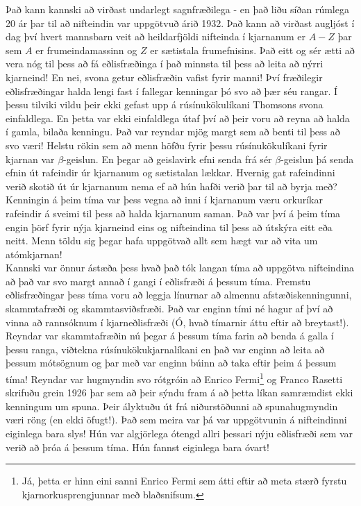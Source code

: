 \ifdefined \wholebook \else\documentclass[oneside]{book}\usepackage{EdlBook}\graphicspath{{figures/}}
\begin{document}
Það kann kannski að virðast undarlegt sagnfræðilega - en það liðu síðan rúmlega 20 ár þar til að nifteindin var uppgötvuð árið 1932. Það kann að virðast augljóst í dag því hvert mannsbarn veit að heildarfjöldi nifteinda í kjarnanum er $A-Z$ þar sem $A$ er frumeindamassinn og $Z$ er sætistala frumefnisins. Það eitt og sér ætti að vera nóg til þess að fá eðlisfræðinga í það minnsta til þess að leita að nýrri kjarneind! En nei, svona getur eðlisfræðin vafist fyrir manni! Því fræðilegir eðlisfræðingar halda lengi fast í fallegar kenningar þó svo að þær séu rangar. Í þessu tilviki vildu þeir ekki gefast upp á rúsínukökulíkani Thomsons svona einfaldlega. En þetta var ekki einfaldlega útaf því að þeir voru að reyna að halda í gamla, bilaða kenningu. Það var reyndar mjög margt sem að benti til þess að svo væri! Helstu rökin sem að menn höfðu fyrir þessu rúsínukökulíkani fyrir kjarnan var $\beta$-geislun. En þegar að geislavirk efni senda frá sér $\beta$-geislun þá senda efnin út rafeindir úr kjarnanum og sætistalan lækkar. Hvernig gat rafeindinni verið skotið út úr kjarnanum nema ef að hún hafði verið þar til að byrja með? Kenningin á þeim tíma var þess vegna að inni í kjarnanum væru orkuríkar rafeindir á sveimi til þess að halda kjarnanum saman. Það var því á þeim tíma engin þörf fyrir nýja kjarneind eins og nifteindina til þess að útskýra eitt eða neitt. Menn töldu sig þegar hafa uppgötvað allt sem hægt var að vita um atómkjarnan! \\

Kannski var önnur ástæða þess hvað það tók langan tíma að uppgötva nifteindina að það var svo margt annað í gangi í eðlisfræði á þessum tíma. Fremstu eðlisfræðingar þess tíma voru að leggja línurnar að almennu afstæðiskenningunni, skammtafræði og skammtasviðsfræði. Það var enginn tími né hagur af því að vinna að rannsóknum í kjarneðlisfræði (Ó, hvað tímarnir áttu eftir að breytast!). Reyndar var skammtafræðin nú þegar á þessum tíma farin að benda á galla í þessu ranga, viðtekna rúsínukökukjarnalíkani en það var enginn að leita að þessum mótsögnum og þar með var enginn búinn að taka eftir þeim á þessum tíma! Reyndar var hugmyndin svo rótgróin að Enrico Fermi\footnote{Já, þetta er hinn eini sanni Enrico Fermi sem átti eftir að meta stærð fyrstu kjarnorkusprengjunnar með blaðsnifsum.} og Franco Rasetti skrifuðu grein 1926 þar sem að þeir sýndu fram á að þetta líkan samræmdist ekki kenningum um spuna. Þeir ályktuðu út frá niðurstöðunni að spunahugmyndin væri röng (en ekki öfugt!). Það sem meira var þá var uppgötvunin á nifteindinni eiginlega bara slys! Hún var algjörlega ótengd allri þessari nýju eðlisfræði sem var verið að þróa á þessum tíma. Hún fannst eiginlega bara óvart! \\
\end{document}
